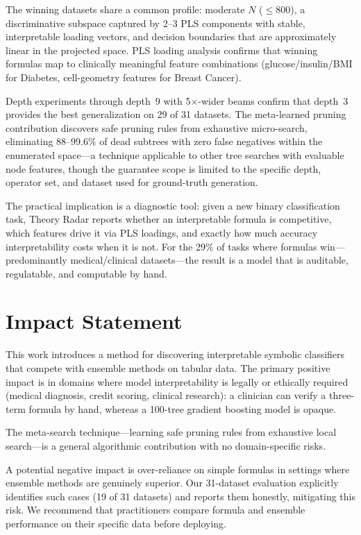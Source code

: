 \documentclass[journal]{IEEEtran}
\begin{document}
The winning datasets share a common profile: moderate $N$
($\leq 800$), a discriminative subspace captured by 2--3 PLS
components with stable, interpretable loading vectors, and
decision boundaries that are approximately linear in the projected
space.  PLS loading analysis confirms that winning formulas map to
clinically meaningful feature combinations (glucose/insulin/BMI
for Diabetes, cell-geometry features for Breast Cancer).

Depth experiments through depth~9 with 5$\times$-wider beams confirm
that depth~3 provides the best generalization on 29 of 31 datasets.
The meta-learned pruning contribution discovers safe pruning rules
from exhaustive micro-search, eliminating 88--99.6\% of dead
subtrees with zero false negatives within the enumerated
space---a technique applicable to other tree searches with
evaluable node features, though the guarantee scope is limited
to the specific depth, operator set, and dataset used for
ground-truth generation.

The practical implication is a diagnostic tool: given a new binary
classification task, Theory Radar reports whether an interpretable
formula is competitive, which features drive it via PLS loadings,
and exactly how much accuracy interpretability costs when it is not.
For the 29\% of tasks where formulas win---predominantly
medical/clinical datasets---the result is a model that is auditable,
regulatable, and computable by hand.

\section*{Impact Statement}

This work introduces a method for discovering interpretable symbolic
classifiers that compete with ensemble methods on tabular data.  The
primary positive impact is in domains where model interpretability is
legally or ethically required (medical diagnosis, credit scoring,
clinical research): a clinician can verify a three-term formula by
hand, whereas a 100-tree gradient boosting model is opaque.

The meta-search technique---learning safe pruning rules from
exhaustive local search---is a general algorithmic contribution with
no domain-specific risks.

A potential negative impact is over-reliance on simple formulas in
settings where ensemble methods are genuinely superior.  Our
31-dataset evaluation explicitly identifies such cases (19 of 31
datasets) and reports them honestly, mitigating this risk.  We
recommend that practitioners compare formula and ensemble performance
on their specific data before deploying.
\end{document}
